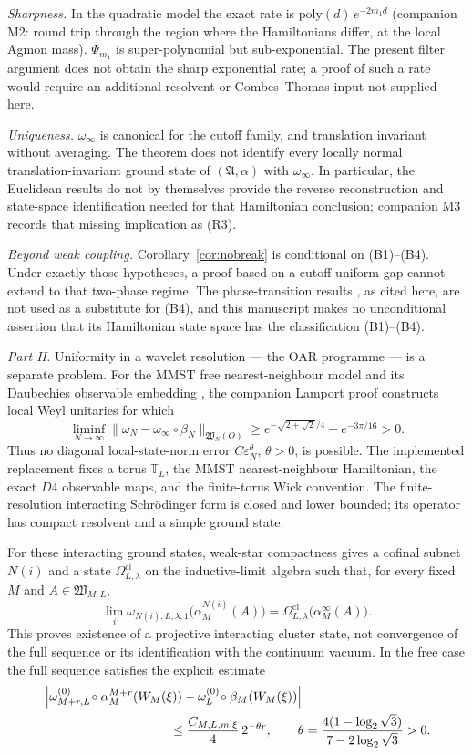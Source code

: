 \documentclass[11pt,a4paper]{article}
\theoremstyle{plain}
\theoremstyle{definition}
\newcommand{\A}{\mathfrak{A}}
\begin{document}
\emph{Sharpness.} In the quadratic model the exact rate is $\mathrm{poly}(d)\,e^{-2m_1d}$
(companion M2: round trip through the region where the Hamiltonians differ, at the local Agmon
mass). $\Psi_{m_1}$ is super-polynomial but sub-exponential. The present filter argument does
not obtain the sharp exponential rate; a proof of such a rate would require an additional
resolvent or Combes--Thomas input not supplied here.

\emph{Uniqueness.} $\omega_\infty$ is canonical for the cutoff family, and translation
invariant without averaging. The theorem does not identify every locally normal
translation-invariant ground state of $(\A,\alpha)$ with $\omega_\infty$. In particular, the
Euclidean results \cite{AHZ,BDW} do not by themselves provide the reverse reconstruction and
state-space identification needed for that Hamiltonian conclusion; companion M3 records that
missing implication as (R3).

\emph{Beyond weak coupling.} Corollary~\ref{cor:nobreak} is conditional on (B1)--(B4).
Under exactly those hypotheses, a proof based on a cutoff-uniform gap cannot extend to that
two-phase regime. The phase-transition results \cite{GJS75,GJS76}, as cited here, are not used
as a substitute for (B4), and this manuscript makes no unconditional assertion that its
Hamiltonian state space has the classification (B1)--(B4).

\emph{Part II.} Uniformity in a wavelet resolution --- the OAR programme --- is a
separate problem.  For the MMST free nearest-neighbour model and its Daubechies
observable embedding \cite{MMST}, the companion Lamport proof constructs local Weyl
unitaries for which
\[
 \liminf_{N\to\infty}
 \|\omega_N-\omega_\infty\mathbin\circ\beta_N\|_{\mathfrak W_N(O)}
 \ge e^{-\sqrt{2+\sqrt2}/4}-e^{-3\pi/16}>0.
\]
Thus no diagonal local-state-norm error $C\varepsilon_N^\theta$, $\theta>0$, is possible.
The implemented replacement fixes a torus $\mathbb T_L$, the MMST nearest-neighbour
Hamiltonian, the exact $D4$ observable maps, and the finite-torus Wick convention.
The finite-resolution interacting Schr\"odinger form is closed and lower bounded; its
operator has compact resolvent and a simple ground state.

For these interacting ground states, weak-star compactness gives a cofinal subnet
$N(i)$ and a state $\Omega_{L,\lambda}^{\mathrm{cl}}$ on the inductive-limit algebra such
that, for every fixed $M$ and $A\in\mathfrak W_{M,L}$,
\[
 \lim_i\omega_{N(i),L,\lambda,1}
   \bigl(\alpha_M^{N(i)}(A)\bigr)
 =\Omega_{L,\lambda}^{\mathrm{cl}}\bigl(\alpha_M^\infty(A)\bigr).
\]
This proves existence of a projective interacting cluster state, not convergence of the
full sequence or its identification with the continuum vacuum.  In the free case the
full sequence satisfies the explicit estimate
\[
\begin{split}
 &\left|\omega_{M+r,L}^{(0)}\!\circ\alpha_M^{M+r}(W_M(\xi))
 -\omega_L^{(0)}\!\circ\beta_M(W_M(\xi))\right|\\
 &\hspace{35mm}\le\frac{C_{M,L,m,\xi}}4\,2^{-\theta r},
 \qquad
 \theta=\frac{4(1-\log_2\sqrt3)}{7-2\log_2\sqrt3}>0.
\end{split}
\]
\end{document}
